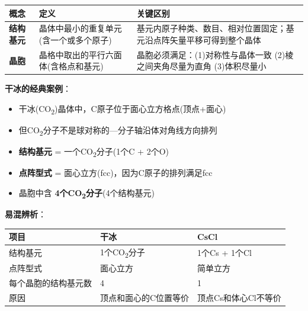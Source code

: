 {\def\LTcaptype{none} %
\begin{longtable}[]{@{}
  >{\raggedright\arraybackslash}p{}
  >{\raggedright\arraybackslash}p{}
  >{\raggedright\arraybackslash}p{}@{}}
\toprule\noalign{}
\begin{minipage}[b]{\linewidth}\raggedright
概念
\end{minipage} & \begin{minipage}[b]{\linewidth}\raggedright
定义
\end{minipage} & \begin{minipage}[b]{\linewidth}\raggedright
关键区别
\end{minipage} \\
\midrule\noalign{}
\endhead
\bottomrule\noalign{}
\endlastfoot
\textbf{结构基元} & 晶体中最小的重复单元(含一个或多个原子) & 基元内原子种类、数目、相对位置固定；基元沿点阵矢量平移可得到整个晶体 \\
\textbf{晶胞} & 晶格中取出的平行六面体(含格点和基元) & 晶胞必须满足：(1)对称性与晶体一致 (2)棱之间夹角尽量为直角 (3)体积尽量小 \\
\end{longtable}
}

\textbf{干冰的经典案例}：

\begin{itemize}
\tightlist
\item
  干冰(CO\textsubscript{2})晶体中，C原子位于面心立方格点(顶点+面心)
\item
  但CO\textsubscript{2}分子不是球对称的---分子轴沿体对角线方向排列
\item
  \textbf{结构基元} = 一个CO\textsubscript{2}分子(1个C + 2个O)
\item
  \textbf{点阵型式} = 面心立方(fcc)，因为C原子的排列满足fcc
\item
  晶胞中含 \textbf{4个CO\textsubscript{2}分子}(4个结构基元)
\end{itemize}

\textbf{易混辨析}：

{\def\LTcaptype{none} %
\begin{longtable}[]{@{}lll@{}}
\toprule\noalign{}
项目 & 干冰 & CsCl \\
\midrule\noalign{}
\endhead
\bottomrule\noalign{}
\endlastfoot
结构基元 & 1个CO\textsubscript{2}分子 & 1个Cs + 1个Cl \\
点阵型式 & 面心立方 & 简单立方 \\
每个晶胞的结构基元数 & 4 & 1 \\
原因 & 顶点和面心的C位置等价 & 顶点Cs和体心Cl不等价 \\
\end{longtable}
}

